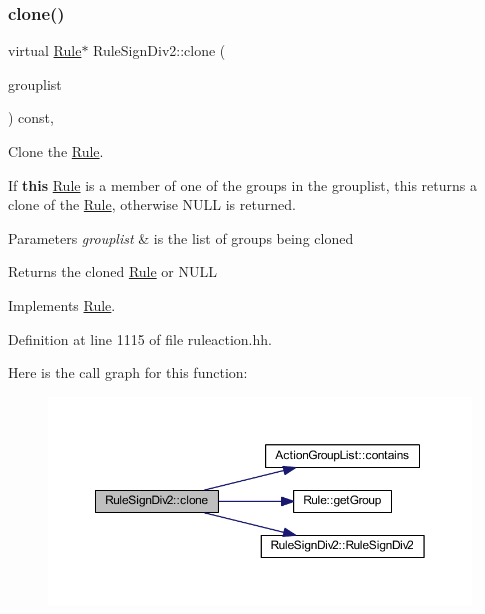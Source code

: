 \subsubsection{\texorpdfstring{clone()}{clone()}}
{\footnotesize\ttfamily virtual \mbox{\hyperlink{class_rule}{Rule}}$\ast$ Rule\+Sign\+Div2\+::clone (\begin{DoxyParamCaption}\item[{const \mbox{\hyperlink{class_action_group_list}{Action\+Group\+List}} \&}]{grouplist }\end{DoxyParamCaption}) const\hspace{0.3cm}{\ttfamily [inline]}, {\ttfamily [virtual]}}



Clone the \mbox{\hyperlink{class_rule}{Rule}}. 

If {\bfseries{this}} \mbox{\hyperlink{class_rule}{Rule}} is a member of one of the groups in the grouplist, this returns a clone of the \mbox{\hyperlink{class_rule}{Rule}}, otherwise N\+U\+LL is returned. 
\begin{DoxyParams}{Parameters}
{\em grouplist} & is the list of groups being cloned \\
\hline
\end{DoxyParams}
\begin{DoxyReturn}{Returns}
the cloned \mbox{\hyperlink{class_rule}{Rule}} or N\+U\+LL 
\end{DoxyReturn}


Implements \mbox{\hyperlink{class_rule_a70de90a76461bfa7ea0b575ce3c11e4d}{Rule}}.



Definition at line 1115 of file ruleaction.\+hh.

Here is the call graph for this function\+:
\nopagebreak
\begin{figure}[H]
\begin{center}
\leavevmode
\includegraphics[width=350pt]{class_rule_sign_div2_a6aa73406ff551ac7714f12d17eb12d39_cgraph}
\end{center}
\end{figure}
\mbox{\label{class_rule_sign_div2_a7c9196f318303cd2767263e731415730}} 
